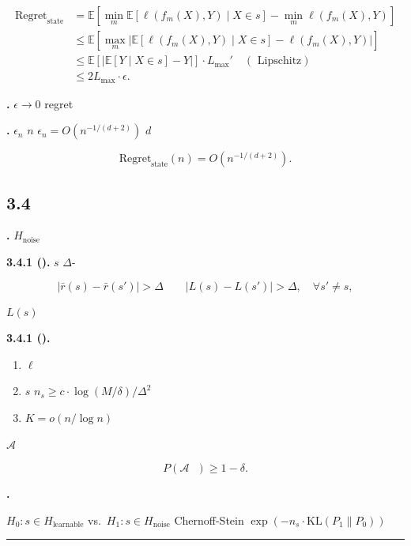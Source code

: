 \documentclass[
  12pt,
]{article}
\providecommand{\tightlist}{%
  \setlength{\itemsep}{0pt}\setlength{\parskip}{0pt}}
\begin{document}
\[\begin{aligned}
\text{Regret}_{\text{state}} &= \mathbb{E}\left[\min_m \mathbb{E}[\ell(f_m(X), Y) \mid X \in s] - \min_m \ell(f_m(X), Y)\right] \\
&\leq \mathbb{E}\left[\max_m |\mathbb{E}[\ell(f_m(X), Y) \mid X \in s] - \ell(f_m(X), Y)|\right] \\
&\leq \mathbb{E}\left[|\mathbb{E}[Y \mid X \in s] - Y|\right] \cdot L_{\max}' \quad (\text{ Lipschitz}) \\
&\leq 2L_{\max} \cdot \epsilon.
\end{aligned}\]

\textbf{.} 
\(\epsilon \to 0\) regret
\textbf{}

\textbf{.}  \(\epsilon_n\)  \(n\) 
\(\epsilon_n = O(n^{-1/(d+2)})\)  \(d\) 

\[\text{Regret}_{\text{state}}(n) = O(n^{-1/(d+2)}).\]

\subsection{3.4
}\label{ux566aux58f0ux72b6ux6001ux7684ux53efux8bc6ux522bux6027ux6761ux4ef6}

\textbf{.}
\(H_{\text{noise}}\)

\textbf{ 3.4.1 ().}  \(s\) 
\(\Delta\)-

\[|\bar{r}(s) - \bar{r}(s')| > \Delta \quad \text{} \quad |L(s) - L(s')| > \Delta, \quad \forall s' \neq s,\]

 \(L(s)\) 

\textbf{ 3.4.1 ().}


\begin{enumerate}
\def\labelenumi{\arabic{enumi}.}
\tightlist
\item
  \(\ell\) 
\item
   \(s\)  \(n_s \geq c \cdot \log(M/\delta) / \Delta^2\)
\item
   \(K = o(n / \log n)\)
\end{enumerate}

 \(\mathcal{A}\) 

\[P(\mathcal{A} \text{ }) \geq 1 - \delta.\]

\textbf{.}

\(H_0: s \in H_{\text{learnable}}\)
vs.~\(H_1: s \in H_{\text{noise}}\) Chernoff-Stein 
\(\exp(-n_s \cdot \text{KL}(P_1 \| P_0))\) 

\begin{center}\rule{0.5\linewidth}{0.5pt}\end{center}
\end{document}

